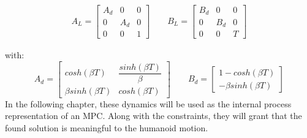 \begin{align}
    A_{L} = 
    \begin{bmatrix}
        A_{d} & 0 & 0 \\
        0 & A_{d} & 0 \\
        0 & 0 & 1
    \end{bmatrix}
    \qquad
    B_{L} = 
    \begin{bmatrix}
        B_{d} & 0 & 0 \\
        0 & B_{d} & 0 \\
        0 & 0 & T
    \end{bmatrix}
\end{align}

with:
\begin{equation}
    A_{d} = 
    \begin{bmatrix}
        cosh(\beta T) & \dfrac{sinh(\beta T)}{\beta} \\
        \beta sinh(\beta T) & cosh(\beta T)
    \end{bmatrix}
    \qquad
    B_{d} = 
    \begin{bmatrix}
        1 - cosh(\beta T) \\
        - \beta sinh(\beta T)
    \end{bmatrix}
\end{equation}
In the following chapter, these dynamics will be used as the internal process representation of an MPC. Along with the constraints, they will grant that the found solution is meaningful to the humanoid motion.